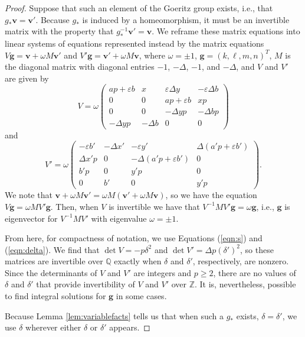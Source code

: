 \documentclass{amsart}     %
\theoremstyle{definition}
\begin{document}
\begin{proof}
Suppose that such an element of the Goeritz group exists, i.e., that $g_* \textbf{v} = \textbf{v}'$. Because $g_*$ is induced by a homeomorphism, it must be an invertible matrix with the property that $g_*^{-1}\textbf{v}' = \textbf{v}$. We reframe these matrix equations into linear systems of equations represented instead by the matrix equations $V \textbf{g} = \textbf{v} + \omega  M \textbf{v}'$ and $V' \textbf{g} = \textbf{v}' + \omega  M \textbf{v}$, where $\omega  = \pm 1$, $\textbf{g} = (k,\ell,m,n)^T$, $M$ is the diagonal matrix with diagonal entries $-1$, $- \Delta$, $-1$, and $-\Delta$, and $V$ and $V'$ are given by 
\[V =  \omega  \begin{pmatrix}  ap+\varepsilon b & x & \varepsilon \Delta y & -\varepsilon \Delta b \\
0 & 0 & ap+\varepsilon b & xp \\ 0 & 0 & -\Delta yp  & -\Delta  bp \\ 
 -\Delta yp& -\Delta b & 0 & 0 \end{pmatrix}\]
and 
\[V' = \omega  \begin{pmatrix}  -\varepsilon b' & - \Delta x' & -\varepsilon y' & \Delta (a' p + \varepsilon b') \\
\Delta x'p & 0 & -\Delta(a'p+\varepsilon b') & 0 \\ b'p & 0 & y'p  & 0 \\ 
0 & b' & 0 & y'p \end{pmatrix}.\] We note that $\textbf{v} + \omega  M \textbf{v}' =   \omega  M(\textbf{v}' + \omega  M \textbf{v})$, so we have the equation $V \textbf{g} = \omega  MV' \textbf{g}$. Then, when $V$ is invertible we have that $V^{-1}M V' \textbf{g} = \omega  \textbf{g}$, i.e., $\textbf{g}$ is eigenvector for $V^{-1}M V'$ with eigenvalue $\omega  = \pm 1$.

From here, for compactness of notation, we use Equations (\ref{eqn:s}) and (\ref{eqn:delta}). We find that $\det V = -p\delta^2$ and $\det V' = \Delta p (\delta ')^2$, so these matrices are invertible over $\mathbb{Q}$ exactly when $\delta$ and $\delta'$, respectively, are nonzero. Since the determinants of $V$ and $V'$ are integers and $p \ge 2$, there are no values of $\delta$ and $\delta '$ that provide invertibility of $V$ and $V'$ over $\mathbb Z$. It is, nevertheless, possible to find integral solutions for $\textbf{g}$ in some cases.

Because Lemma \ref{lem:variablefacts} tells us that when such a $g_*$ exists, $\delta = \delta'$, we use $\delta$ wherever either $\delta$ or $\delta'$ appears. 


\end{proof}
\end{document}
